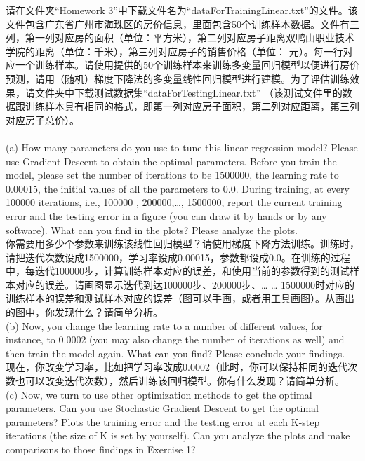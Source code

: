 \documentclass[a4paper]{article}
\theoremstyle{definition}
\begin{document}
请在文件夹“Homework 3”中下载文件名为“dataForTrainingLinear.txt”的文件。该文件包含广东省广州市海珠区的房价信息，里面包含50个训练样本数据。文件有三列，第一列对应房的面积（单位：平方米），第二列对应房子距离双鸭山职业技术学院的距离（单位：千米），第三列对应房子的销售价格（单位：
元）。每一行对应一个训练样本。请使用提供的50个训练样本来训练多变量回归模型以便进行房价预测，请用（随机）梯度下降法的多变量线性回归模型进行建模。为了评估训练效果，请文件夹中下载测试数据集“dataForTestingLinear.txt” （该测试文件里的数据跟训练样本具有相同的格式，即第一列对应房子面积，第二列对应距离，第三列对应房子总价）。
\\
\\
(a) How many parameters do you use to tune this linear regression model?  Please use Gradient Descent to obtain the optimal parameters. Before you train the model, please set the number of iterations to be 1500000, the learning rate to 0.00015, the initial values of all the parameters to 0.0. During training, at every 100000 iterations, i.e., 100000 , 200000,…, 1500000, report the current training error and the testing error in a figure (you can draw it by hands or by any software). What can you find in the plots? Please analyze the plots. \\

你需要用多少个参数来训练该线性回归模型？请使用梯度下降方法训练。训练时，请把迭代次数设成1500000，学习率设成0.00015，参数都设成0.0。在训练的过程中，每迭代100000步，计算训练样本对应的误差，和使用当前的参数得到的测试样本对应的误差。请画图显示迭代到达100000步、200000步、… … 1500000时对应的训练样本的误差和测试样本对应的误差（图可以手画，或者用工具画图）。从画出的图中，你发现什么？请简单分析。\\

(b)  Now, you change the learning rate to a number of different values, for instance, to 0.0002 (you may also change the number of iterations as well) and then train the model again. What can you find? Please conclude your findings. \\

现在，你改变学习率，比如把学习率改成0.0002（此时，你可以保持相同的迭代次数也可以改变迭代次数），然后训练该回归模型。你有什么发现？请简单分析。\\

(c) Now, we turn to use other optimization methods to get the optimal parameters. Can you use Stochastic Gradient Descent to get the optimal parameters? Plots the training error and the testing error at each K-step iterations (the size of K is set by yourself). Can you analyze the plots and make comparisons to those findings in Exercise 1?\\
\end{document}
